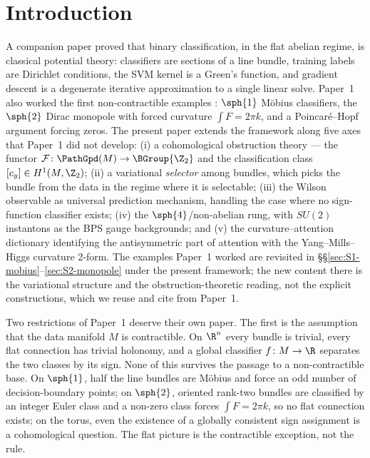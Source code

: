 \section{Introduction}\label{sec:intro}

A companion paper \cite{Vasii2026Paper1} proved that binary
classification, in the flat abelian regime, is classical potential
theory: classifiers are sections of a line bundle, training labels are
Dirichlet conditions, the SVM kernel is a Green's function, and
gradient descent is a degenerate iterative approximation to a single
linear solve. Paper~1 also worked the first non-contractible
examples \cite[\S 9]{Vasii2026Paper1}: $\sph{1}$ M\"obius
classifiers, the $\sph{2}$ Dirac monopole with forced curvature
$\int F = 2\pi k$, and a Poincar\'e--Hopf argument forcing zeros.
The present paper extends the framework along five axes that
Paper~1 did not develop: (i) a cohomological obstruction theory ---
the functor $\mathcal{F}\colon\PathGpd(M)\to\BGroup{\Z_2}$ and the
classification class $[c_y]\in H^1(M,\Z_2)$; (ii) a variational
\emph{selector} among bundles, which picks the bundle from the data
in the regime where it is selectable; (iii) the Wilson observable
as universal prediction mechanism, handling the case where no
sign-function classifier exists; (iv) the $\sph{4}$/non-abelian
rung, with $SU(2)$ instantons as the BPS gauge backgrounds; and
(v) the curvature--attention dictionary identifying the
antisymmetric part of attention with the Yang--Mills--Higgs
curvature 2-form. The examples Paper~1 worked are revisited in
\S\S\ref{sec:S1-mobius}--\ref{sec:S2-monopole} under the present
framework; the new content there is the variational structure and
the obstruction-theoretic reading, not the explicit constructions,
which we reuse and cite from Paper~1.

Two restrictions of Paper~1 deserve their own paper. The first is
the assumption that the data manifold $M$ is contractible. On
$\R^n$ every bundle is trivial, every flat connection has trivial
holonomy, and a global classifier $f\colon M\to\R$ separates the
two classes by its sign. None of this survives the passage to a
non-contractible base. On $\sph{1}$, half the line bundles are
M\"obius and force an odd number of decision-boundary points; on
$\sph{2}$, oriented rank-two bundles are classified by an integer
Euler class and a non-zero class forces $\int F = 2\pi k$, so no
flat connection exists; on the torus, even the existence of a
globally consistent sign assignment is a cohomological question.
The flat picture is the contractible exception, not the rule.

